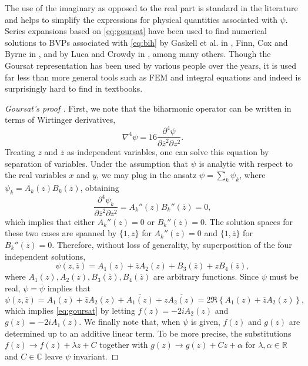 \documentclass{article}
\newcommand{\reals}{\mathbb{R}}
\newcommand{\conj}[1]{{\overline{#1}}}
\begin{document}
The use of the imaginary as opposed to the real part is standard in the
literature and helps to simplify the expressions for physical quantities
associated with $\psi$. Series expansions based on \eqref{eq:goursat} have been
used to find numerical solutions to BVPs associated with \eqref{eq:bih} by
Gaskell et al. in \cite{gaskell98}, Finn, Cox and Byrne in \cite{finn03}, and
by Luca and Crowdy in \cite{luca18}, among many others. Though the Goursat
representation has been used by various people over the years, it is used far
less than more general tools such as FEM and integral equations and indeed is
surprisingly hard to find in textbooks.

\begin{proof}[Goursat's proof \cite{goursat98}]
First, we note that the biharmonic operator can be written in terms of
Wirtinger derivatives,
\begin{equation}
\nabla^4 \psi = 16\frac{\partial^4 \psi}{\partial\conj{z}^2 \partial z^2}.
\end{equation}
Treating $z$ and $\conj{z}$ as independent variables, one can solve this
equation by separation of variables. Under the assumption that $\psi$ is
analytic with respect to the real variables $x$ and $y$, we may plug in the
ansatz $\psi=\sum_k \psi_k$, where $\psi_k= A_k(z)B_k(\conj{z})$, obtaining
\begin{equation}
\frac{\partial^4 \psi_k}{\partial\conj{z}^2 \partial z^2} 
   = A_k''(z) B_k''(\conj{z}) = 0,
\end{equation} 
which implies that either $A_k''(z)=0$ or $B_k''(\conj{z})=0$. The solution
spaces for these two cases are spanned by $\{1,z\}$ for $A_k''(z)=0$  and
$\{1,\conj{z}\}$ for $B_k''(\conj{z})=0$. Therefore, without loss of
generality, by superposition of the four independent solutions,
\begin{equation}
\psi(z,\conj{z}) =  A_1(z) + \conj{z} A_2(z) + B_3(\conj{z}) + z B_4(\conj{z}),
\end{equation}
where $A_1(z), A_2(z), B_3(\conj{z}), B_4(\conj{z})$ are arbitrary functions.
Since $\psi$ must be real, $\psi=\conj{\psi}$ implies that 
\begin{equation}
\psi(z,\conj{z}) =  A_1(z)  + \conj{z} A_2(z)  + \conj{A_1(z)} + z \conj{A_2(z)} 
                 = 2 \Re\left\{A_1(z) + \conj{z} A_2(z)\right\},
\end{equation}
which implies \eqref{eq:goursat} by letting $f(z) = -2i A_2(z)$
and $g(z) = -2i A_1(z)$. We finally note that, when $\psi$ is given, $f(z)$
and $g(z)$ are determined up to an additive linear term. To be more precise,
the substitutions $f(z)\to f(z)+\lambda z + C$ together with $g(z)\to
g(z)+\conj{C}z+\alpha$ for $\lambda,\alpha\in\reals$ and $C\in\mathbb{C}$
leave $\psi$ invariant.
\end{proof}
\end{document}
